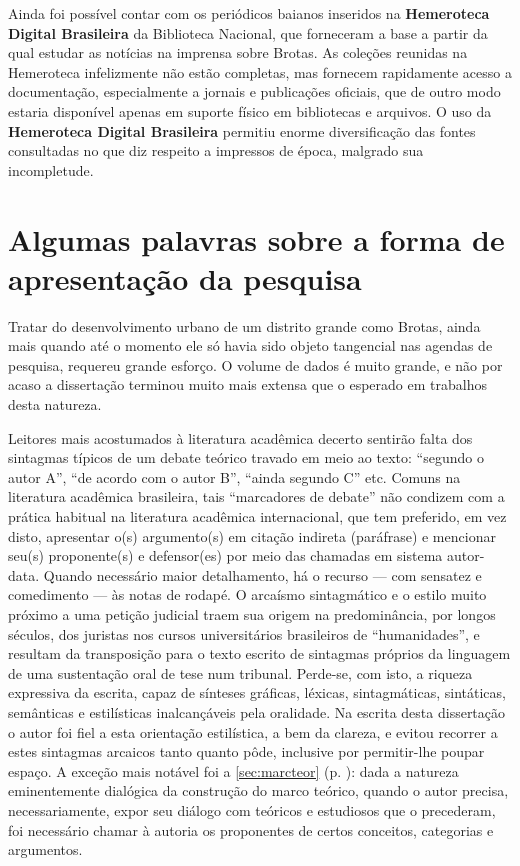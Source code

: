 Ainda foi possível contar com os periódicos baianos inseridos na \textbf{Hemeroteca Digital Brasileira} da Biblioteca Nacional, que forneceram a base a partir da qual estudar as notícias na imprensa sobre Brotas. As coleções reunidas na Hemeroteca infelizmente não estão completas, mas fornecem rapidamente acesso a documentação, especialmente a jornais e publicações oficiais, que de outro modo estaria disponível apenas em suporte físico em bibliotecas e arquivos. O uso da \textbf{Hemeroteca Digital Brasileira} permitiu enorme diversificação das fontes consultadas no que diz respeito a impressos de época, malgrado sua incompletude.

\section{Algumas palavras sobre a forma de apresentação da pesquisa}

Tratar do desenvolvimento urbano de um distrito grande como Brotas, ainda mais quando até o momento ele só havia sido objeto tangencial nas agendas de pesquisa, requereu grande esforço. O volume de dados é muito grande, e não por acaso a dissertação terminou muito mais extensa que o esperado em trabalhos desta natureza.

Leitores mais acostumados à literatura acadêmica decerto sentirão falta dos sintagmas típicos de um debate teórico travado em meio ao texto: ``segundo o autor A'', ``de acordo com o autor B'', ``ainda segundo C'' etc. Comuns na literatura acadêmica brasileira, tais ``marcadores de debate'' não condizem com a prática habitual na literatura acadêmica internacional, que tem preferido, em vez disto, apresentar o(s) argumento(s) em citação indireta (paráfrase) e mencionar seu(s) proponente(s) e defensor(es) por meio das chamadas em sistema autor-data. Quando necessário maior detalhamento, há o recurso --- com sensatez e comedimento --- às notas de rodapé. O arcaísmo sintagmático e o estilo muito próximo a uma petição judicial traem sua origem na predominância, por longos séculos, dos juristas nos cursos universitários brasileiros de ``humanidades'', e resultam da transposição para o texto escrito de sintagmas próprios da linguagem de uma sustentação oral de tese num tribunal. Perde-se, com isto, a riqueza expressiva da escrita, capaz de sínteses gráficas, léxicas, sintagmáticas, sintáticas, semânticas e estilísticas inalcançáveis pela oralidade. Na escrita desta dissertação o autor foi fiel a esta orientação estilística, a bem da clareza, e evitou recorrer a estes sintagmas arcaicos tanto quanto pôde, inclusive por permitir-lhe poupar espaço. A exceção mais notável foi a \autoref{sec:marcteor} (p. \pageref{sec:marcteor}): dada a natureza eminentemente dialógica da construção do marco teórico, quando o autor precisa, necessariamente, expor seu diálogo com teóricos e estudiosos que o precederam, foi necessário chamar à autoria os proponentes de certos conceitos, categorias e argumentos.

